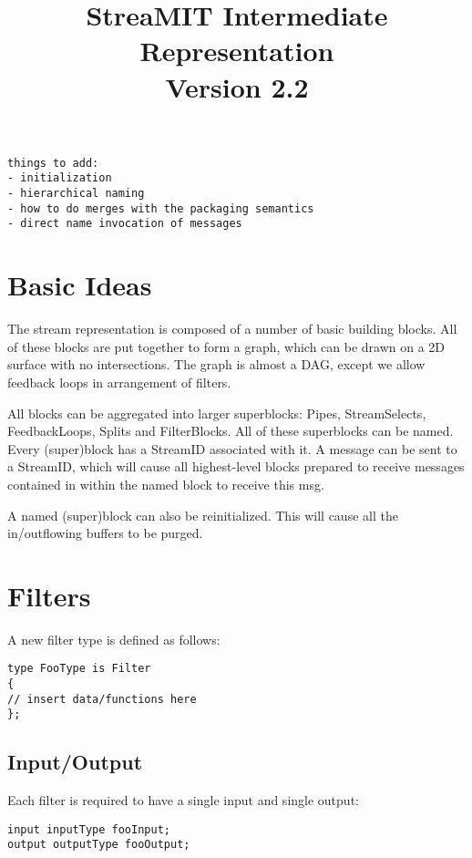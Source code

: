 \title{StreaMIT Intermediate Representation \\ Version 2.2}



\maketitle

\begin{verbatim}
things to add:
- initialization
- hierarchical naming 
- how to do merges with the packaging semantics
- direct name invocation of messages
\end{verbatim}

\section{Basic Ideas}

The stream representation is composed of a number of basic building blocks.
All of these blocks are put together to form a graph, which can be drawn
on a 2D surface with no intersections.  The graph is almost a DAG, except
we allow feedback loops in arrangement of filters.

All blocks can be aggregated into larger superblocks:  Pipes, StreamSelects,
FeedbackLoops, Splits and FilterBlocks.  
All of these superblocks can be named.  Every 
(super)block has a StreamID associated with it.  A message can be sent 
to a StreamID, which will cause all highest-level blocks prepared to
receive messages contained in within the named block
to receive this msg.

A named (super)block can also be reinitialized.  This will cause all the 
in/outflowing buffers to be purged.

\section{Filters}
A new filter type is defined as follows:

\begin{verbatim}
type FooType is Filter
{
// insert data/functions here
};
\end{verbatim}

\subsection{Input/Output}

Each filter is required to have a single input and single output:
\begin{verbatim}
input inputType fooInput;
output outputType fooOutput;
\end{verbatim}

